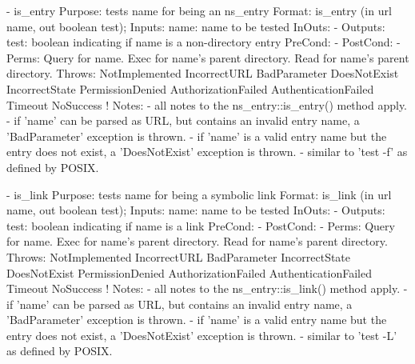 \begin{myspec}
 
    - is_entry
      Purpose:  tests name for being an ns_entry
      Format:   is_entry           (in  url       name,
                                    out boolean   test);
      Inputs:   name:               name to be tested
      InOuts:   -
      Outputs:  test:               boolean indicating if name
                                    is a non-directory entry
      PreCond:  -
      PostCond: -
      Perms:    Query for name.
                Exec  for name's parent directory.
                Read  for name's parent directory.
      Throws:   NotImplemented
                IncorrectURL
                BadParameter
                DoesNotExist
                IncorrectState
                PermissionDenied
                AuthorizationFailed
                AuthenticationFailed
                Timeout
                NoSuccess
!     Notes:    - all notes to the ns_entry::is_entry() method 
                  apply.
                - if 'name' can be parsed as URL, but contains 
                  an invalid entry name, a 'BadParameter'
                  exception is thrown.
                - if 'name' is a valid entry name but the entry
                  does not exist, a 'DoesNotExist' exception is
                  thrown.
                - similar to 'test -f' as defined by POSIX.
 
 
    - is_link
      Purpose:  tests name for being a symbolic link
      Format:   is_link            (in  url       name,
                                    out boolean   test);
      Inputs:   name:               name to be tested
      InOuts:   -
      Outputs:  test:               boolean indicating if name
                                    is a link
      PreCond:  -
      PostCond: -
      Perms:    Query for name.
                Exec  for name's parent directory.
                Read  for name's parent directory.
      Throws:   NotImplemented
                IncorrectURL
                BadParameter
                IncorrectState
                DoesNotExist
                PermissionDenied
                AuthorizationFailed
                AuthenticationFailed
                Timeout
                NoSuccess
!     Notes:    - all notes to the ns_entry::is_link() method 
                  apply.
                - if 'name' can be parsed as URL, but contains 
                  an invalid entry name, a 'BadParameter'
                  exception is thrown.
                - if 'name' is a valid entry name but the entry
                  does not exist, a 'DoesNotExist' exception is
                  thrown.
                - similar to 'test -L' as defined by POSIX.
 

\end{myspec}
